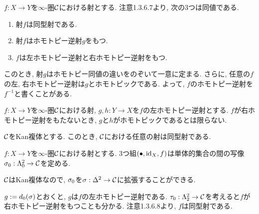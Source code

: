 \documentclass[uplatex, a4paper, 14Q, dvipdfmx]{jsreport}
\begin{document}
\begin{remark}
  $f: X \to Y$を$\infty$-圏$\mathcal{C}$における射とする. 
  注意1.3.6.7より, 次の3つは同値である. 
  \begin{enumerate}
    \item 射$f$は同型射である. 
    \item 射$f$はホモトピー逆射$g$をもつ. 
    \item $f$は左ホモトピー逆射と右ホモトピー逆射をもつ. 
  \end{enumerate}
\end{remark}

このとき, 射$g$はホモトピー同値の違いをのぞいて一意に定まる. 
さらに, 任意の$f$の左, 右ホモトピー逆射は$g$とホモトピックである. 
よって, $f$のホモトピー逆射を$f^{-1}$と書くことがある. 

\begin{remark}
  $f: X \to Y$を$\infty$-圏$\mathcal{C}$における射, $g,h: Y \to X$を$f$の左ホモトピー逆射とする. 
  $f$が右ホモトピー逆射をもたないとき, $g$と$h$がホモトピックであるとは限らない. 
\end{remark}

\begin{prop}
  $\mathcal{C}$をKan複体とする. 
  このとき, $\mathcal{C}$における任意の射は同型射である. 
\end{prop}

\begin{Proof}
  $f: X \to Y$を$\infty$-圏$\mathcal{C}$における射とする. 
  3つ組$(\bullet,\mathrm{id}_X,f)$は単体的集合の間の写像$\sigma_0: \Lambda^2_0 \to \mathcal{C}$を定める. 
  \begin{center}
  \end{center}
  $\mathcal{C}$はKan複体なので, $\sigma_0$を$\sigma: \Delta^2 \to \mathcal{C}$に拡張することができる. 
  \begin{center}
  \end{center}
  $g:=d_0(\sigma)$とおくと, $g$は$f$の左ホモトピー逆射である. 
  $\tau_0: \Lambda^2_2 \to \mathcal{C}$を考えると$f$が右ホモトピー逆射をもつことも分かる. 
  注意1.3.6.8より, $f$は同型射である. 
\end{Proof}
\end{document}
